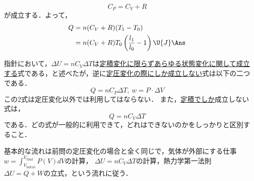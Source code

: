 \begin{multicols}{2}
\begin{bekkai}
\[C_P=C_V+R\]
が成立する．よって，
\[\begin{aligned}
  Q&=n(C_V+R)(T_1-T_0)\\
   &=n(C_V+R)T_0\left(\frac{l_1}{l_0}-1\right)\U{J}\Ans
\end{aligned}\]
\end{bekkai}
\begin{chuu}
指針において，$\Delta U=nC_V\Delta T$は\underline{定積変化}\hskip0pt\underline{に限らず}\hskip0pt\underline{あらゆる}\hskip0pt\underline{状態変化}\hskip0pt\underline{に関して}\hskip0pt\underline{成立する}式である，と述べたが，逆に\underline{定圧変化}\hskip0pt\underline{の際にし}\hskip0pt\underline{か成立し}\hskip0pt\underline{ない}式は以下の二つである．
\[Q=nC_P\Delta T,\ w=P\cdot\Delta V\]
この2式は定圧変化以外では利用してはならない．
また，\underline{定積でし}\hskip0pt\underline{か}成立しない式は，
\[Q=nC_V\Delta T\]
である．どの式が一般的に利用できて，どれはできないのかをしっかりと区別すること．
\end{chuu}

\par\nopagebreak
\begin{sisin}
基本的な流れは前問の定圧変化の場合と全く同じで，気体が外部にする仕事$w=\displaystyle\int_{V_{\mathrm{initial}}}^{V_{\mathrm{final}}}P(V)dV$の計算， $\Delta U=nC_V\Delta T$の計算，熱力学第一法則$\Delta U=Q+W$の立式，という流れに従う．


\end{sisin}
\end{multicols}
